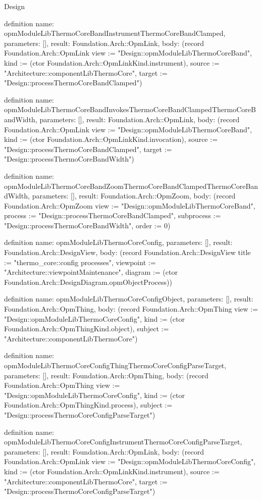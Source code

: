 \begin{lexlean}{Design}
\begin{semanticmodule}
definition{
  name: opmModuleLibThermoCoreBandInstrumentThermoCoreBandClamped,
  parameters: [],
  result: Foundation.Arch::OpmLink,
  body: (record Foundation.Arch::OpmLink {view := "Design::opmModuleLibThermoCoreBand", kind := (ctor Foundation.Arch::OpmLinkKind.instrument), source := "Architecture::componentLibThermoCore", target := "Design::processThermoCoreBandClamped"})
}

definition{
  name: opmModuleLibThermoCoreBandInvokesThermoCoreBandClampedThermoCoreBandWidth,
  parameters: [],
  result: Foundation.Arch::OpmLink,
  body: (record Foundation.Arch::OpmLink {view := "Design::opmModuleLibThermoCoreBand", kind := (ctor Foundation.Arch::OpmLinkKind.invocation), source := "Design::processThermoCoreBandClamped", target := "Design::processThermoCoreBandWidth"})
}

definition{
  name: opmModuleLibThermoCoreBandZoomThermoCoreBandClampedThermoCoreBandWidth,
  parameters: [],
  result: Foundation.Arch::OpmZoom,
  body: (record Foundation.Arch::OpmZoom {view := "Design::opmModuleLibThermoCoreBand", process := "Design::processThermoCoreBandClamped", subprocess := "Design::processThermoCoreBandWidth", order := 0})
}

definition{
  name: opmModuleLibThermoCoreConfig,
  parameters: [],
  result: Foundation.Arch::DesignView,
  body: (record Foundation.Arch::DesignView {title := "thermo_core::config processes", viewpoint := "Architecture::viewpointMaintenance", diagram := (ctor Foundation.Arch::DesignDiagram.opmObjectProcess)})
}

definition{
  name: opmModuleLibThermoCoreConfigObject,
  parameters: [],
  result: Foundation.Arch::OpmThing,
  body: (record Foundation.Arch::OpmThing {view := "Design::opmModuleLibThermoCoreConfig", kind := (ctor Foundation.Arch::OpmThingKind.object), subject := "Architecture::componentLibThermoCore"})
}

definition{
  name: opmModuleLibThermoCoreConfigThingThermoCoreConfigParseTarget,
  parameters: [],
  result: Foundation.Arch::OpmThing,
  body: (record Foundation.Arch::OpmThing {view := "Design::opmModuleLibThermoCoreConfig", kind := (ctor Foundation.Arch::OpmThingKind.process), subject := "Design::processThermoCoreConfigParseTarget"})
}

definition{
  name: opmModuleLibThermoCoreConfigInstrumentThermoCoreConfigParseTarget,
  parameters: [],
  result: Foundation.Arch::OpmLink,
  body: (record Foundation.Arch::OpmLink {view := "Design::opmModuleLibThermoCoreConfig", kind := (ctor Foundation.Arch::OpmLinkKind.instrument), source := "Architecture::componentLibThermoCore", target := "Design::processThermoCoreConfigParseTarget"})
}


\end{semanticmodule}
\end{lexlean}
